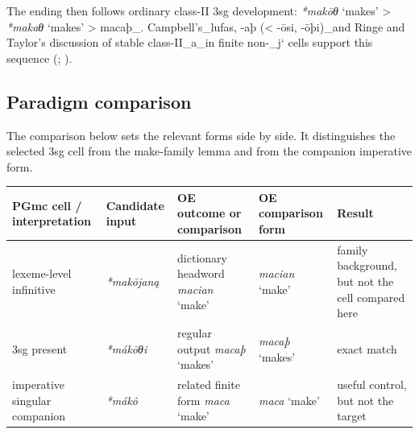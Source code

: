 \documentclass[
  british,
  a4paper,
  openany]{book}
\newcounter{none} %
\providecommand{\Recon}[1]{\emph{*#1}}
{\catcode`→=\active \global\def→{\ensuremath{\rightarrow}}}
\providecommand{\Recon}[1]{\emph{*#1}}
{\catcode`→=\active \global\def→{\ensuremath{\rightarrow}}}
\begin{document}
The ending then follows ordinary class-II 3sg development: \Recon{makōθ}
`makes' \textgreater{} \Recon{makaθ} `makes' \textgreater{} macaþ\_.
Campbell's\_lufas, -aþ (\textless{} -ōsi, -ōþi)\_and Ringe and Taylor's
discussion of stable class-II\_a\_in finite non-\_j` cells support this
sequence (;
).

\subsection{Paradigm comparison}\label{paradigm-comparison-19}

The comparison below sets the relevant forms side by side. It
distinguishes the selected 3sg cell from the make-family lemma and from
the companion imperative form.

{\def\LTcaptype{none} %
\begin{longtable}[]{@{}
  >{\raggedright\arraybackslash}p{}
  >{\raggedright\arraybackslash}p{}
  >{\raggedright\arraybackslash}p{}
  >{\raggedright\arraybackslash}p{}
  >{\raggedright\arraybackslash}p{}@{}}
\toprule\noalign{}
\begin{minipage}[b]{\linewidth}\raggedright
PGmc cell / interpretation
\end{minipage} & \begin{minipage}[b]{\linewidth}\raggedright
Candidate input
\end{minipage} & \begin{minipage}[b]{\linewidth}\raggedright
OE outcome or comparison
\end{minipage} & \begin{minipage}[b]{\linewidth}\raggedright
OE comparison form
\end{minipage} & \begin{minipage}[b]{\linewidth}\raggedright
Result
\end{minipage} \\
\midrule\noalign{}
\endhead
\bottomrule\noalign{}
\endlastfoot
lexeme-level infinitive & {\emph{*makōjaną}} & dictionary headword
{\emph{macian}} `make' & {\emph{macian}} `make' & family background, but
not the cell compared here \\
3sg present & {\emph{*mákōθi}} & regular output {\emph{macaþ}} `makes' &
{\emph{macaþ}} `makes' & exact match \\
imperative singular companion & {\emph{*mákô}} & related finite form
{\emph{maca}} `make' & {\emph{maca}} `make' & useful control, but not
the target \\
\end{longtable}
}
\end{document}
